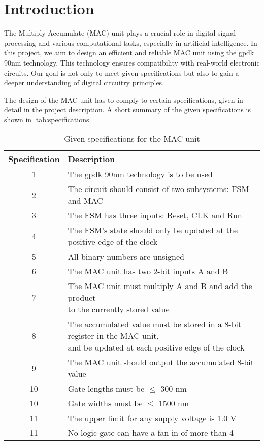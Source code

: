\section{Introduction}
\label{sec:introduction}

The Multiply-Accumulate (MAC) unit plays a crucial role in digital signal processing and various computational tasks, especially in artificial intelligence. In this project, we aim to design an efficient and reliable MAC unit using the gpdk 90nm technology. This technology ensures compatibility with real-world electronic circuits. Our goal is not only to meet given specifications but also to gain a deeper understanding of digital circuitry principles. 

The design of the MAC unit has to comply to certain specifications, given in detail in the project description\cite{project_description}. A short summary of the given specifications is shown in \autoref{tab:specifications}.

\begin{table}[H]
\caption{Given specifications for the MAC unit}
\label{tab:specifications}
\centering
\begin{tabular}{|c|l|}
\hline
\rowcolor[HTML]{C0C0C0} 
 Specification & Description \\ \hline
 1 & The gpdk 90nm technology is to be used \\ \hline
 2 & The circuit should consist of two subsystems: FSM and MAC \\ \hline
 3 & The FSM has three inputs: Reset, CLK and Run  \\ \hline
 4 & The FSM’s state should only be updated at the positive edge of the clock \\ \hline
 5 & All binary numbers are unsigned \\ \hline
 6 & The MAC unit has two 2-bit inputs A and B \\ \hline
 7 & \makecell[l]{The MAC unit must multiply A and B and add the product\\ to the currently stored value}  \\ \hline
 8 & \makecell[l]{The accumulated value must be stored in a 8-bit register in the MAC unit,\\ and be updated at each positive edge of the clock} \\ \hline
 9 & The MAC unit should output the accumulated 8-bit value \\ \hline
 10 & Gate lengths must be $\le$ 300 nm \\ \hline
 10 & Gate widths must be $\le$ 1500 nm \\ \hline
 11 & The upper limit for any supply voltage is 1.0 V \\ \hline
 11 & No logic gate can have a fan-in of more than 4 \\ \hline
\end{tabular}
\end{table}

